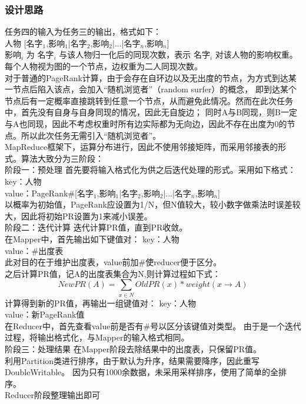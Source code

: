 \documentclass[a4paper,UTF8]{article}
\numberwithin{equation}{section}
\begin{document}
\subsubsection{设计思路}
任务四的输入为任务三的输出，格式如下：\\
人物 [名字$_1$,影响$_1$|名字$_2$,影响$_2$|...|名字$_n$,影响$_n$] \\
影响$_i$ 为 名字$_i$ 与该人物归一化后的同现次数，表示 名字$_i$ 对该人物的影响权重。\\
每个人物视为图的一个节点，边权重为二人同现次数。\\
对于普通的PageRank计算，由于会存在自环边以及无出度的节点，为方式到达某一节点后陷入该点，会加入“随机浏览者”（random surfer）的概念，
即到达某个节点后有一定概率直接跳转到任意一个节点，从而避免此情况。然而在此次任务中，首先没有自身与自身同现的情况，因此无自旋边；
同时A与B同现，则B一定与A也同现，因此不考虑权重时所有边实际都为无向边，因此不存在出度为0的节点。所以此次任务无需引入“随机浏览者”。\\

MapReduce框架下，运算分布进行，因此不使用邻接矩阵，而采用邻接表的形式。算法大致分为三阶段：\\

阶段一：预处理
首先要将输入格式化为供之后迭代处理的形式。采用如下格式：
key：人物\\
value：PageRank\#[名字$_1$,影响$_1$|名字$_2$,影响$_2$|...|名字$_n$,影响$_n$] \\
以概率为初始值，PageRank应设置为1/N，但N值较大，较小数字做乘法时误差较大，因此将初始PR设置为1来减小误差。\\

阶段二：迭代计算
迭代计算PR值，直到PR收敛。\\
在Mapper中，首先输出如下键值对：
key：人物\\
value：\#出度表\\
此对目的在于维护出度表，value前加\#使reducer便于区分。\\
之后计算PR值，记A的出度表集合为N,则计算过程如下式：
$$
NewPR(A)=\sum_{x\in N}OldPR(x)*weight(x\rightarrow A)    
$$
计算得到新的PR值，再输出一组键值对：
key：人物\\
value：新PageRank值\\
在Reducer中，首先查看value前是否有\#号以区分该键值对类型。
由于是一个迭代过程，将输出格式化，与Mapper的输入格式相同。\\

阶段三：处理结果
在Mapper阶段去除结果中的出度表，只保留PR值。\\
利用Partition类进行排序，由于默认为升序，结果需要降序，因此重写DoubleWritable。
因为只有1000余数据，未采用采样排序，使用了简单的全排序。\\
Reducer阶段整理输出即可
\end{document}
